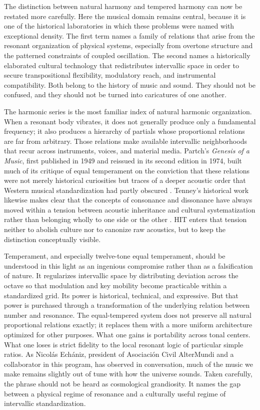 The distinction between natural harmony and tempered harmony can now be restated more carefully. Here the musical domain remains central, because it is one of the historical laboratories in which these problems were named with exceptional density. The first term names a family of relations that arise from the resonant organization of physical systems, especially from overtone structure and the patterned constraints of coupled oscillation. The second names a historically elaborated cultural technology that redistributes intervallic space in order to secure transpositional flexibility, modulatory reach, and instrumental compatibility. Both belong to the history of music and sound. They should not be confused, and they should not be turned into caricatures of one another.

The harmonic series is the most familiar index of natural harmonic organization. When a resonant body vibrates, it does not generally produce only a fundamental frequency; it also produces a hierarchy of partials whose proportional relations are far from arbitrary. Those relations make available intervallic neighborhoods that recur across instruments, voices, and material media. Partch's \emph{Genesis of a Music}, first published in 1949 and reissued in its second edition in 1974, built much of its critique of equal temperament on the conviction that these relations were not merely historical curiosities but traces of a deeper acoustic order that Western musical standardization had partly obscured \parencite{partch_1949_1974}. Tenney's historical work likewise makes clear that the concepts of consonance and dissonance have always moved within a tension between acoustic inheritance and cultural systematization rather than belonging wholly to one side or the other \parencite{tenney_1988}. HIT enters that tension neither to abolish culture nor to canonize raw acoustics, but to keep the distinction conceptually visible.

Temperament, and especially twelve-tone equal temperament, should be understood in this light as an ingenious compromise rather than as a falsification of nature. It regularizes intervallic space by distributing deviation across the octave so that modulation and key mobility become practicable within a standardized grid. Its power is historical, technical, and expressive. But that power is purchased through a transformation of the underlying relation between number and resonance. The equal-tempered system does not preserve all natural proportional relations exactly; it replaces them with a more uniform architecture optimized for other purposes. What one gains is portability across tonal centers. What one loses is strict fidelity to the local resonant logic of particular simple ratios. As Nicol\'as Ech\'aniz, president of Asociaci\'on Civil AlterMundi and a collaborator in this program, has observed in conversation, much of the music we make remains slightly out of tune with how the universe sounds. Taken carefully, the phrase should not be heard as cosmological grandiosity. It names the gap between a physical regime of resonance and a culturally useful regime of intervallic standardization.

